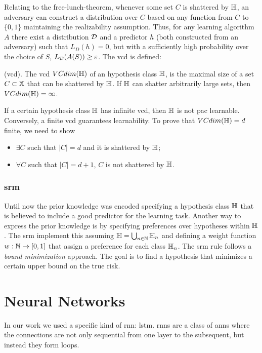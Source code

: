 Relating to the free-lunch-theorem, whenever some set $C$ is shattered
by $\mathbb{H}$, an adversary can 
construct a distribution over $C$ based on any function from $C$ to
$\{0,1\}$ maintaining the realizability assumption. Thus, for any
learning algorithm $A$ there exist a distribution $\mathcal{D}$ and a
predictor $h$
(both constructed from an adversary) such that $L_D(h)=0$, but with a
sufficiently high probability over the choice of $S$,
$L_{\mathcal{D}}(A(S))\geq\varepsilon$. The \ac{vcd} is defined:
\begin{definition}
  (\ac{vcd}). The \ac{vcd} $VCdim(\mathbb{H})$ of an hypothesis class
  $\mathbb{H}$, is the maximal size of a set $C\subset\mathbb{X}$ that can be
  shattered by $\mathbb{H}$. If $\mathbb{H}$ can shatter arbitrarily large sets,
  then $VCdim(\mathbb{H})=\infty$.
\end{definition}

If a certain hypothesis class $\mathbb{H}$ has infinite \ac{vcd}, then
$\mathbb{H}$ is not \ac{pac} learnable. Conversely, a finite \ac{vcd}
guarantees learnability. To prove that $VCdim(\mathbb{H})=d$ finite, we
need to show
\begin{itemize}
\item $\exists C$ such that $|C|=d$ and it is shattered by $\mathbb{H}$;
\item $\forall C$ such that $|C|=d+1$, $C$ is not shattered by
  $\mathbb{H}$. 
\end{itemize}

\subsubsection{\ac{srm}}
Until now the prior knowledge was encoded specifying a hypothesis
class $\mathbb{H}$ that is believed to include a good predictor for the
learning task. Another way to express the prior knowledge is by
specifying preferences over hypotheses within $\mathbb{H}$. The \ac{srm}
implement this assuming $\mathbb{H}=\bigcup_{n\in\mathbb{N}}\mathbb{H}_n$ and
defining a weight function $w:\mathbb{N}\rightarrow[0,1]$ that assign a
preference for each class $\mathbb{H}_n$. The \ac{srm} rule follows a
\emph{bound minimization} approach. The goal is to find a hypothesis
that minimizes a certain upper bound on the true risk.

\section{Neural Networks}
In our work we used a specific kind of \ac{rnn}: \ac{lstm}.
\acp{rnn} are a class of \acp{ann} where the connections are not only
sequential from one layer to the subsequent, but instead they form
loops. 


